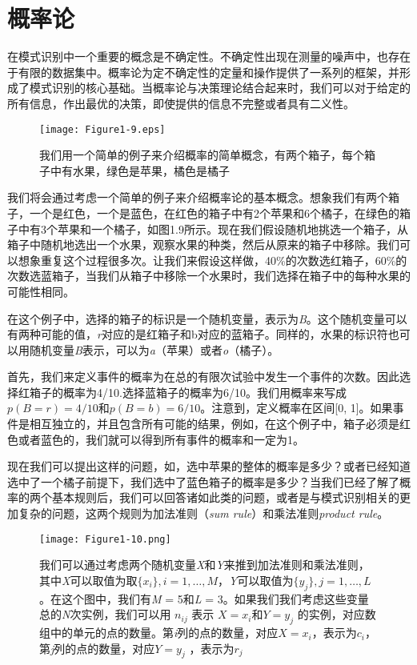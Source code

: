 \section{概率论}
	在模式识别中一个重要的概念是不确定性。不确定性出现在测量的噪声中，也存在于有限的数据集中。概率论为定不确定性的定量和操作提供了一系列的框架，并形成了模式识别的核心基础。当概率论与决策理论结合起来时，我们可以对于给定的所有信息，作出最优的决策，即使提供的信息不完整或者具有二义性。
	
	\begin{figure}[b]
		\parbox{.4\textwidth}{\caption{我们用一个简单的例子来介绍概率的简单概念，有两个箱子，每个箱子中有水果，绿色是苹果，橘色是橘子}}
		\parbox{.5\textwidth}{\texttt{[image: Figure1-9.eps]}}
	\end{figure}
	
	我们将会通过考虑一个简单的例子来介绍概率论的基本概念。想象我们有两个箱子，一个是红色，一个是蓝色，在红色的箱子中有2个苹果和6个橘子，在绿色的箱子中有3个苹果和一个橘子，如图1.9所示。现在我们假设随机地挑选一个箱子，从箱子中随机地选出一个水果，观察水果的种类，然后从原来的箱子中移除。我们可以想象重复这个过程很多次。让我们来假设这样做，40\%的次数选红箱子，60\%的次数选蓝箱子，当我们从箱子中移除一个水果时，我们选择在箱子中的每种水果的可能性相同。
	
	在这个例子中，选择的箱子的标识是一个随机变量，表示为\textit{B}。这个随机变量可以有两种可能的值，\textit{r}对应的是红箱子和b对应的蓝箱子。同样的，水果的标识符也可以用随机变量\textit{B}表示，可以为\textit{a}（苹果）或者\textit{o}（橘子）。
	
	首先，我们来定义事件的概率为在总的有限次试验中发生一个事件的次数。因此选择红箱子的概率为4/10.选择蓝箱子的概率为6/10。我们用概率来写成$p(B = r) = 4/10$和$p(B = b) = 6/10$。注意到，定义概率在区间[0, 1]。如果事件是相互独立的，并且包含所有可能的结果，例如，在这个例子中，箱子必须是红色或者蓝色的，我们就可以得到所有事件的概率和一定为1。
	
	现在我们可以提出这样的问题，如，选中苹果的整体的概率是多少？或者已经知道选中了一个橘子前提下，我们选中了蓝色箱子的概率是多少？当我们已经了解了概率的两个基本规则后，我们可以回答诸如此类的问题，或者是与模式识别相关的更加复杂的问题，这两个规则为加法准则（\textit{sum rule}）和乘法准则\textit{product rule}。

	\begin{figure}[t]
		\parbox{.6\textwidth}{\caption{ 我们可以通过考虑两个随机变量\textit{X}和\textit{Y}来推到加法准则和乘法准则，其中\textit{X}可以取值为取$ \{x_i \}, i = 1, \dots, M$，\textit{Y}可以取值为$ \{y_j \}, j = 1, \dots, L$。在这个图中，我们有\textit{M} = 5和\textit{L} = 3。如果我们我们考虑这些变量总的\textit{N}次实例，我们可以用 $n_{ij}$ 表示 $ X = x_i $和$ Y = y_j $ 的实例，对应数组中的单元的点的数量。第\textit{i}列的点的数量，对应$X = x_i$，表示为$c_i$，第\textit{j}列的点的数量，对应$Y = y_j$ ，表示为$r_j$ }}
		\parbox{.3\textwidth}{\texttt{[image: Figure1-10.png]}}
	\end{figure}
	
